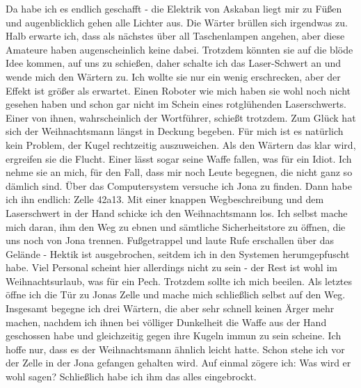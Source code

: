 Da habe ich es endlich geschafft - die Elektrik von Askaban liegt mir zu Füßen und augenblicklich gehen alle Lichter aus. Die Wärter brüllen sich irgendwas zu. Halb erwarte ich, dass als nächstes über all Taschenlampen angehen, aber diese Amateure haben augenscheinlich keine dabei. Trotzdem könnten sie auf die blöde Idee kommen, auf uns zu schießen, daher schalte ich das Laser-Schwert an und wende mich den Wärtern zu. Ich wollte sie nur ein wenig erschrecken, aber der Effekt ist größer als erwartet. Einen Roboter wie mich haben sie wohl noch nicht gesehen haben und schon gar nicht im Schein eines rotglühenden Laserschwerts. Einer von ihnen, wahrscheinlich der Wortführer, schießt trotzdem. Zum Glück hat sich der Weihnachtsmann längst in Deckung begeben. Für mich ist es natürlich kein Problem, der Kugel rechtzeitig auszuweichen. Als den Wärtern das klar wird, ergreifen sie die Flucht. Einer lässt sogar seine Waffe fallen, was für ein Idiot. Ich nehme sie an mich, für den Fall, dass mir noch Leute begegnen, die nicht ganz so dämlich sind. Über das Computersystem versuche ich Jona zu finden. Dann habe ich ihn endlich: Zelle 42a13. Mit einer knappen Wegbeschreibung und dem Laserschwert in der Hand schicke ich den Weihnachtsmann los. Ich selbst mache mich daran, ihm den Weg zu ebnen und sämtliche Sicherheitstore zu öffnen, die uns noch von Jona trennen. Fußgetrappel und laute Rufe erschallen über das Gelände - Hektik ist ausgebrochen, seitdem ich in den Systemen herumgepfuscht habe. Viel Personal scheint hier allerdings nicht zu sein - der Rest ist wohl im Weihnachtsurlaub, was für ein Pech. Trotzdem sollte ich mich beeilen. Als letztes öffne ich die Tür zu Jonas Zelle und mache mich schließlich selbst auf den Weg. Insgesamt begegne ich drei Wärtern, die aber sehr schnell keinen Ärger mehr machen, nachdem ich ihnen bei völliger Dunkelheit die Waffe aus der Hand geschossen habe und gleichzeitig gegen ihre Kugeln immun zu sein scheine. Ich hoffe nur, dass es der Weihnachtsmann ähnlich leicht hatte. Schon stehe ich vor der Zelle in der Jona gefangen gehalten wird. Auf einmal zögere ich: Was wird er wohl sagen? Schließlich habe ich ihm das alles eingebrockt.
